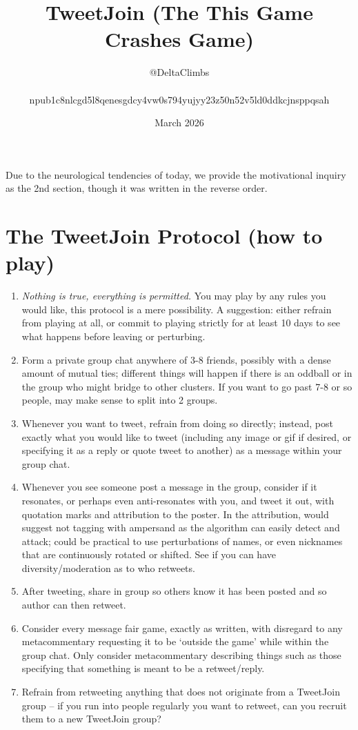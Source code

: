 \documentclass{article}
\title{\vspace{-3em}TweetJoin (The This Game Crashes Game)}
\author{@DeltaClimbs \\\phantom{ }\\npub1c8nlcgd5l8qenesgdcy4vw0s794yujyy23z50n52v5ld0ddkcjnsppqsah}}
\date{March 2026}
\begin{document}
\maketitle

\noindent Due to the neurological tendencies of today, we provide the motivational inquiry as the 2nd section, though it was written in the reverse order.

\section{The TweetJoin Protocol (how to play)}

\begin{enumerate}
    \item \textit{Nothing is true, everything is permitted.} You may play by any rules you would like, this protocol is a mere possibility. A suggestion: either refrain from playing at all, or commit to playing strictly for at least 10 days to see what happens before leaving or perturbing.
    \item Form a private group chat anywhere of 3-8 friends, possibly with a dense amount of mutual ties; different things will happen if there is an oddball or in the group who might bridge to other clusters. If you want to go past 7-8 or so people, may make sense to split into 2 groups.
    \item Whenever you want to tweet, refrain from doing so directly; instead, post exactly what you would like to tweet (including any image or gif if desired, or specifying it as a reply or quote tweet to another) as a message within your group chat.
    \item Whenever you see someone post a message in the group, consider if it resonates, or perhaps even anti-resonates with you, and tweet it out, with quotation marks and attribution to the poster. In the attribution, would suggest not tagging with ampersand as the algorithm can easily detect and attack; could be practical to use perturbations of names, or even nicknames that are continuously rotated or shifted. See if you can have diversity/moderation as to who retweets.
    \item After tweeting, share in group so others know it has been posted and so author can then retweet.
    \item Consider every message fair game, exactly as written, with disregard to any metacommentary requesting it to be `outside the game' while within the group chat. Only consider metacommentary describing things such as those specifying that something is meant to be a retweet/reply.
    \item Refrain from retweeting anything that does not originate from a TweetJoin group -- if you run into people regularly you want to retweet, can you recruit them to a new TweetJoin group?   
\end{enumerate}
\end{document}
